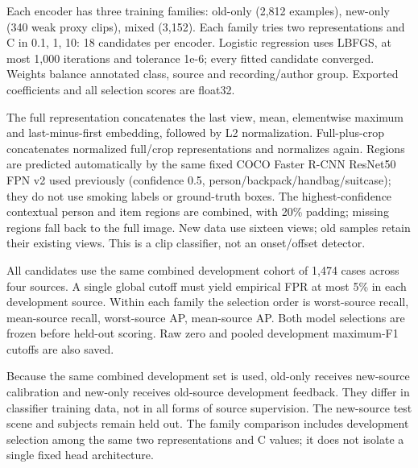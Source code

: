 \documentclass[10pt,a4paper]{article}
\begin{document}
Each encoder has three training families: old-only (2,812 examples), new-only (340 weak proxy clips), mixed (3,152). Each family tries two representations and C in 0.1, 1, 10: 18 candidates per encoder. Logistic regression uses LBFGS, at most 1,000 iterations and tolerance 1e-6; every fitted candidate converged. Weights balance annotated class, source and recording/author group. Exported coefficients and all selection scores are float32.

The full representation concatenates the last view, mean, elementwise maximum and last-minus-first embedding, followed by L2 normalization. Full-plus-crop concatenates normalized full/crop representations and normalizes again. Regions are predicted automatically by the same fixed COCO Faster R-CNN ResNet50 FPN v2 used previously (confidence 0.5, person/backpack/handbag/suitcase); they do not use smoking labels or ground-truth boxes. The highest-confidence contextual person and item regions are combined, with 20\% padding; missing regions fall back to the full image. New data use sixteen views; old samples retain their existing views. This is a clip classifier, not an onset/offset detector.

All candidates use the same combined development cohort of 1,474 cases across four sources. A single global cutoff must yield empirical FPR at most 5\% in each development source. Within each family the selection order is worst-source recall, mean-source recall, worst-source AP, mean-source AP. Both model selections are frozen before held-out scoring. Raw zero and pooled development maximum-F1 cutoffs are also saved.

Because the same combined development set is used, old-only receives new-source calibration and new-only receives old-source development feedback. They differ in classifier training data, not in all forms of source supervision. The new-source test scene and subjects remain held out. The family comparison includes development selection among the same two representations and C values; it does not isolate a single fixed head architecture.
\end{document}
